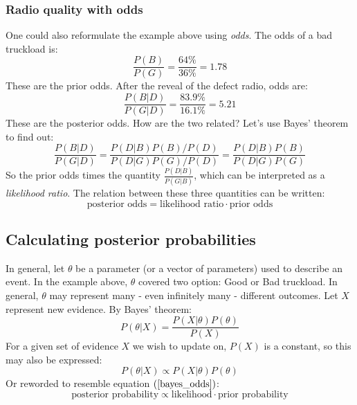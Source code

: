 \documentclass[12pt, a4paper]{article}
\begin{document}
\subsubsection{Radio quality with odds}
One could also reformulate the example above using \textit{odds}. The odds of a bad truckload is:
\begin{equation}
\frac{P(B)}{P(G)}=\frac{64\%}{36\%}=1.78
\end{equation} 
These are the prior odds. After the reveal of the defect radio, odds are:
\begin{equation}
\frac{P(B|D)}{P(G|D)}=\frac{83.9\%}{16.1\%}=5.21
\end{equation}
These are the posterior odds. How are the two related? Let's use Bayes' theorem to find out:
\begin{equation}
\frac{P(B|D)}{P(G|D)}=\frac{P(D|B)P(B)/P(D)}{P(D|G)P(G)/P(D)}=\frac{P(D|B)P(B)}{P(D|G)P(G)}
\end{equation}
So the prior odds times the quantity $\frac{P(D|B)}{P(G|B)}$, which can be interpreted as a \textit{likelihood ratio}. The relation between these three quantities can be written:
\begin{equation}
\label{bayes_odds}
\textrm{posterior odds}=\textrm{likelihood ratio}\cdot\textrm{prior odds}
\end{equation}

\subsection{Calculating posterior probabilities}
In general, let $\theta$ be a parameter (or a vector of parameters) used to describe an event. In the example above, $\theta$ covered two option: Good or Bad truckload. In general, $\theta$ may represent many - even infinitely many - different outcomes. Let $X$ represent new evidence. By Bayes' theorem:
\begin{equation}
P(\theta|X)=\frac{P(X|\theta)P(\theta)}{P(X)}
\end{equation}
For a given set of evidence $X$ we wish to update on, $P(X)$ is a constant, so this may also be expressed:
\begin{equation}
\label{bayes_prob}
P(\theta|X)\propto P(X|\theta)P(\theta)
\end{equation}
Or reworded to resemble equation $(\ref{bayes_odds})$:
\begin{equation}
\label{bayes_prob2}
\textrm{posterior probability}\propto\textrm{likelihood}\cdot\textrm{prior probability}
\end{equation}
\end{document}
